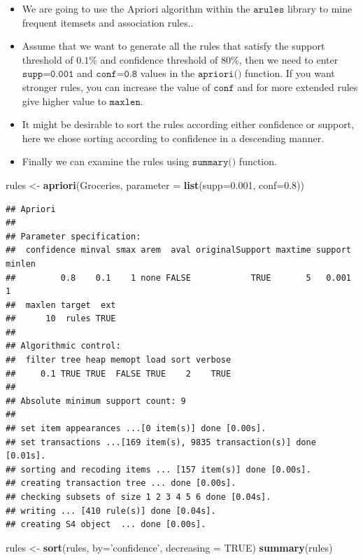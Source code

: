 \documentclass[
]{book}
\newenvironment{Shaded}{\begin{snugshade}}{\end{snugshade}}
\newcommand{\DataTypeTok}[1]{\textcolor[rgb]{0.13,0.29,0.53}{#1}}
\newcommand{\FloatTok}[1]{\textcolor[rgb]{0.00,0.00,0.81}{#1}}
\newcommand{\KeywordTok}[1]{\textcolor[rgb]{0.13,0.29,0.53}{\textbf{#1}}}
\newcommand{\NormalTok}[1]{#1}
\newcommand{\OtherTok}[1]{\textcolor[rgb]{0.56,0.35,0.01}{#1}}
\newcommand{\StringTok}[1]{\textcolor[rgb]{0.31,0.60,0.02}{#1}}
\begin{document}
\begin{itemize}
\item
  We are going to use the Apriori algorithm within the \(\texttt{arules}\) library to mine frequent itemsets and association rules..
\item
  Assume that we want to generate all the rules that satisfy the support threshold of \(0.1\%\) and confidence threshold of \(80\%\), then we need to enter \(\texttt{supp=0.001}\) and \(\texttt{conf=0.8}\) values in the \(\texttt{apriori()}\) function. If you want stronger rules, you can increase the value of \(\texttt{conf}\) and for more extended rules give higher value to \(\texttt{maxlen}\).
\item
  It might be desirable to sort the rules according either confidence or support, here we chose sorting according to confidence in a descending manner.
\item
  Finally we can examine the rules using \(\texttt{summary()}\) function.
\end{itemize}

\begin{Shaded}
\begin{Highlighting}[]
\NormalTok{rules <-}\StringTok{ }\KeywordTok{apriori}\NormalTok{(Groceries, }\DataTypeTok{parameter =} \KeywordTok{list}\NormalTok{(}\DataTypeTok{supp=}\FloatTok{0.001}\NormalTok{, }\DataTypeTok{conf=}\FloatTok{0.8}\NormalTok{))}
\end{Highlighting}
\end{Shaded}

\begin{verbatim}
## Apriori
## 
## Parameter specification:
##  confidence minval smax arem  aval originalSupport maxtime support minlen
##         0.8    0.1    1 none FALSE            TRUE       5   0.001      1
##  maxlen target  ext
##      10  rules TRUE
## 
## Algorithmic control:
##  filter tree heap memopt load sort verbose
##     0.1 TRUE TRUE  FALSE TRUE    2    TRUE
## 
## Absolute minimum support count: 9 
## 
## set item appearances ...[0 item(s)] done [0.00s].
## set transactions ...[169 item(s), 9835 transaction(s)] done [0.01s].
## sorting and recoding items ... [157 item(s)] done [0.00s].
## creating transaction tree ... done [0.00s].
## checking subsets of size 1 2 3 4 5 6 done [0.04s].
## writing ... [410 rule(s)] done [0.04s].
## creating S4 object  ... done [0.00s].
\end{verbatim}

\begin{Shaded}
\begin{Highlighting}[]
\NormalTok{rules <-}\StringTok{ }\KeywordTok{sort}\NormalTok{(rules, }\DataTypeTok{by=}\StringTok{'confidence'}\NormalTok{, }\DataTypeTok{decreasing =} \OtherTok{TRUE}\NormalTok{)}
\KeywordTok{summary}\NormalTok{(rules)}
\end{Highlighting}
\end{Shaded}
\end{document}
